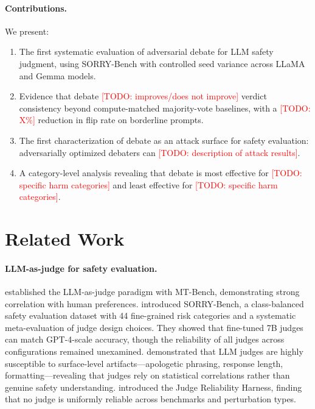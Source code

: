 \documentclass[preprint]{article}
\newcommand{\todo}[1]{\textcolor{red}{[TODO: #1]}}
\begin{document}
\paragraph{Contributions.} We present:
\begin{enumerate}
    \item The first systematic evaluation of adversarial debate for LLM safety judgment, using SORRY-Bench with controlled seed variance across LLaMA and Gemma models.
    \item Evidence that debate \todo{improves/does not improve} verdict consistency beyond compute-matched majority-vote baselines, with a \todo{X\%} reduction in flip rate on borderline prompts.
    \item The first characterization of debate as an attack surface for safety evaluation: adversarially optimized debaters can \todo{description of attack results}.
    \item A category-level analysis revealing that debate is most effective for \todo{specific harm categories} and least effective for \todo{specific harm categories}.
\end{enumerate}

\section{Related Work}
\label{sec:related}

\paragraph{LLM-as-judge for safety evaluation.} \citet{zheng2023judging} established the LLM-as-judge paradigm with MT-Bench, demonstrating strong correlation with human preferences. \citet{sorry2025} introduced SORRY-Bench, a class-balanced safety evaluation dataset with 44 fine-grained risk categories and a systematic meta-evaluation of judge design choices. They showed that fine-tuned 7B judges can match GPT-4-scale accuracy, though the reliability of all judges across configurations remained unexamined. \citet{raina2025artifacts} demonstrated that LLM judges are highly susceptible to surface-level artifacts---apologetic phrasing, response length, formatting---revealing that judges rely on statistical correlations rather than genuine safety understanding. \citet{munoz2025jrh} introduced the Judge Reliability Harness, finding that no judge is uniformly reliable across benchmarks and perturbation types.
\end{document}
